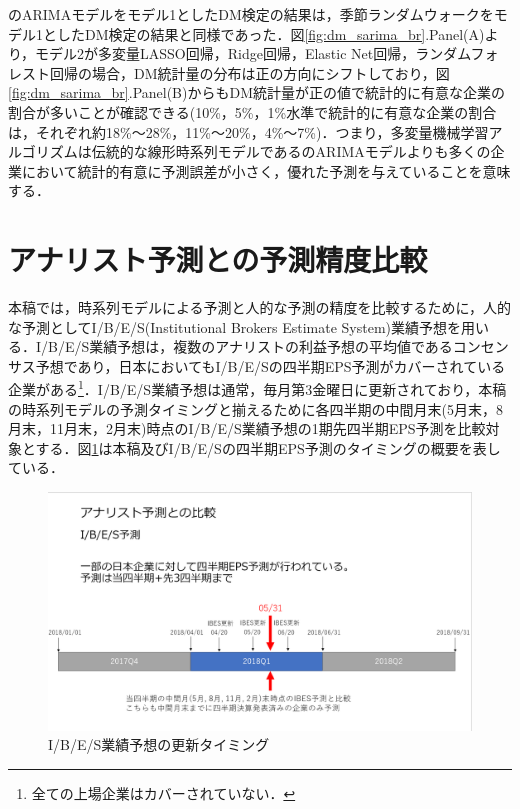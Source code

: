 \documentclass[a4paper，12pt]{jsarticle}
\begin{document}
\cite{brown1979univariate}のARIMAモデルをモデル1としたDM検定の結果は，季節ランダムウォークをモデル1としたDM検定の結果と同様であった．図\ref{fig:dm_sarima_br}.Panel(A)より，モデル2が多変量LASSO回帰，Ridge回帰，Elastic Net回帰，ランダムフォレスト回帰の場合，DM統計量の分布は正の方向にシフトしており，図\ref{fig:dm_sarima_br}.Panel(B)からもDM統計量が正の値で統計的に有意な企業の割合が多いことが確認できる(10\%，5\%，1\%水準で統計的に有意な企業の割合は，それぞれ約18\%～28\%，11\%～20\%，4\%～7\%)．つまり，多変量機械学習アルゴリズムは伝統的な線形時系列モデルである\cite{brown1979univariate}のARIMAモデルよりも多くの企業において統計的有意に予測誤差が小さく，優れた予測を与えていることを意味する．

\section{アナリスト予測との予測精度比較}

本稿では，時系列モデルによる予測と人的な予測の精度を比較するために，人的な予測としてI/B/E/S(Institutional Brokers Estimate System)業績予想を用いる．I/B/E/S業績予想は，複数のアナリストの利益予想の平均値であるコンセンサス予想であり，日本においてもI/B/E/Sの四半期EPS予測がカバーされている企業がある\footnote{全ての上場企業はカバーされていない．}．I/B/E/S業績予想は通常，毎月第3金曜日に更新されており，本稿の時系列モデルの予測タイミングと揃えるために各四半期の中間月末(5月末，8月末，11月末，2月末)時点のI/B/E/S業績予想の1期先四半期EPS予測を比較対象とする．図\ref{fig:ibes_timing}は本稿及びI/B/E/Sの四半期EPS予測のタイミングの概要を表している．

\begin{figure}
  \centering
  \caption{I/B/E/S業績予想の更新タイミング}
  \label{fig:ibes_timing}
  \includegraphics[width=12cm]{./img/_ibes_timing.png}
\end{figure}
\end{document}
